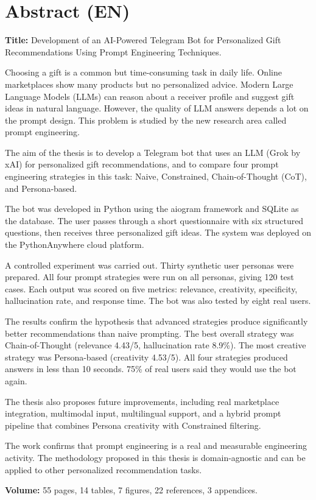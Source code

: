 \chapter*{Abstract (EN)}

\textbf{Title:} Development of an AI-Powered Telegram Bot for Personalized Gift Recommendations Using Prompt Engineering Techniques.

Choosing a gift is a common but time-consuming task in daily life. Online marketplaces show many products but no personalized advice. Modern Large Language Models (LLMs) can reason about a receiver profile and suggest gift ideas in natural language. However, the quality of LLM answers depends a lot on the prompt design. This problem is studied by the new research area called prompt engineering.

The aim of the thesis is to develop a Telegram bot that uses an LLM (Grok by xAI) for personalized gift recommendations, and to compare four prompt engineering strategies in this task: Naive, Constrained, Chain-of-Thought (CoT), and Persona-based.

The bot was developed in Python using the aiogram framework and SQLite as the database. The user passes through a short questionnaire with six structured questions, then receives three personalized gift ideas. The system was deployed on the PythonAnywhere cloud platform.

A controlled experiment was carried out. Thirty synthetic user personas were prepared. All four prompt strategies were run on all personas, giving 120 test cases. Each output was scored on five metrics: relevance, creativity, specificity, hallucination rate, and response time. The bot was also tested by eight real users.

The results confirm the hypothesis that advanced strategies produce significantly better recommendations than naive prompting. The best overall strategy was Chain-of-Thought (relevance 4.43/5, hallucination rate 8.9\%). The most creative strategy was Persona-based (creativity 4.53/5). All four strategies produced answers in less than 10 seconds. 75\% of real users said they would use the bot again.

The thesis also proposes future improvements, including real marketplace integration, multimodal input, multilingual support, and a hybrid prompt pipeline that combines Persona creativity with Constrained filtering.

The work confirms that prompt engineering is a real and measurable engineering activity. The methodology proposed in this thesis is domain-agnostic and can be applied to other personalized recommendation tasks.

\textbf{Volume:} 55 pages, 14 tables, 7 figures, 22 references, 3 appendices.
